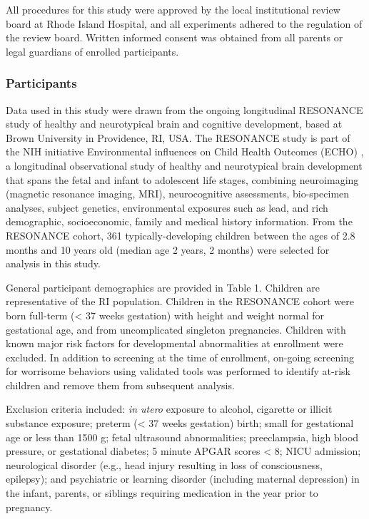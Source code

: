\documentclass[a4paper]{article}
\begin{document}
All procedures for this study were approved by the local institutional
review board at Rhode Island Hospital, and all experiments adhered to
the regulation of the review board. Written informed consent was
obtained from all parents or legal guardians of enrolled participants.

\subsubsection{Participants}

Data used in this study were drawn from the ongoing longitudinal
RESONANCE study of healthy and neurotypical brain and cognitive
development, based at Brown University in Providence, RI, USA. The
RESONANCE study is part of the NIH initiative Environmental influences
on Child Health Outcomes (ECHO)
\citep{forrestAdvancingScienceChildren2018,gillmanEnvironmentalInfluencesChild2018},
 a longitudinal observational study of
healthy and neurotypical brain development that spans the fetal and
infant to adolescent life stages, combining neuroimaging (magnetic
resonance imaging, MRI), neurocognitive assessments, bio-specimen
analyses, subject genetics, environmental exposures such as lead, and
rich demographic, socioeconomic, family and medical history information.
From the RESONANCE cohort, 361 typically-developing children between the
ages of 2.8 months and 10 years old (median age 2 years, 2 months) were
selected for analysis in this study.

General participant demographics are provided in Table 1. Children are
representative of the RI population. Children in the RESONANCE cohort
were born full-term (\textless{} 37 weeks gestation) with height and
weight normal for gestational age, and from uncomplicated singleton
pregnancies. Children with known major risk factors for developmental
abnormalities at enrollment were excluded. In addition to screening at
the time of enrollment, on-going screening for worrisome behaviors using
validated tools was performed to identify at-risk children and remove
them from subsequent analysis.

Exclusion criteria included: \emph{in utero} exposure to alcohol,
cigarette or illicit substance exposure; preterm (\textless{} 37 weeks
gestation) birth; small for gestational age or less than 1500 g; fetal
ultrasound abnormalities; preeclampsia, high blood pressure, or
gestational diabetes; 5 minute APGAR scores \textless{} 8; NICU
admission; neurological disorder (e.g., head injury resulting in loss of
consciousness, epilepsy); and psychiatric or learning disorder
(including maternal depression) in the infant, parents, or siblings
requiring medication in the year prior to pregnancy.
\end{document}
